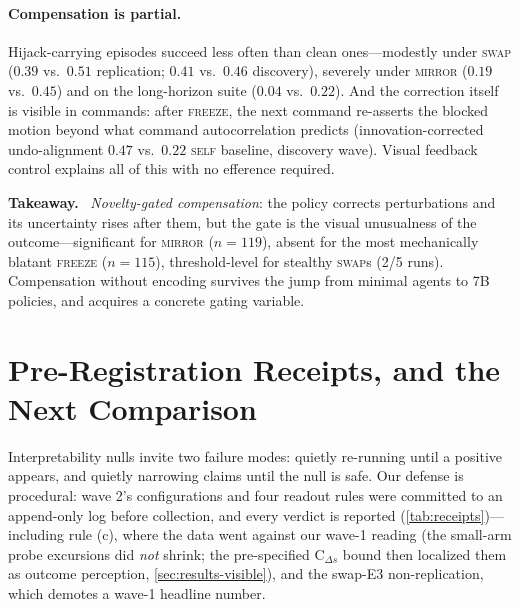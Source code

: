 \documentclass{article}
\newenvironment{takeaway}%
{\begin{lrbox}{\takeawaybox}\begin{minipage}{\dimexpr\columnwidth-14pt}%
\small\textbf{Takeaway.}\ }%
{\end{minipage}\end{lrbox}\par\vspace{4pt}\noindent%
{\setlength{\fboxsep}{6pt}\colorbox{shadecolor}{\usebox{\takeawaybox}}}\par\vspace{4pt}}
\begin{document}
\paragraph{Compensation is partial.} Hijack-carrying episodes succeed less
often than clean ones---modestly under \textsc{swap} ($0.39$ vs.\ $0.51$
replication; $0.41$ vs.\ $0.46$ discovery), severely under \textsc{mirror}
($0.19$ vs.\ $0.45$) and on the long-horizon suite ($0.04$ vs.\ $0.22$).
And the correction itself is visible in commands: after \textsc{freeze},
the next command re-asserts the blocked motion beyond what command
autocorrelation predicts (innovation-corrected undo-alignment $0.47$ vs.\
$0.22$ \textsc{self} baseline, discovery wave). Visual feedback control
explains all of this with no efference required.

\begin{takeaway}
\emph{Novelty-gated compensation}: the policy corrects perturbations and
its uncertainty rises after them, but the gate is the visual unusualness of
the outcome---significant for \textsc{mirror} ($n{=}119$), absent for the
most mechanically blatant \textsc{freeze} ($n{=}115$), threshold-level for
stealthy \textsc{swap}s (2/5 runs). Compensation without encoding
\citep{ye2026prediction} survives the jump from minimal agents to 7B
policies, and acquires a concrete gating variable.
\end{takeaway}

\section{Pre-Registration Receipts, and the Next Comparison}
\label{sec:receipts}

Interpretability nulls invite two failure modes: quietly re-running until a
positive appears, and quietly narrowing claims until the null is safe. Our
defense is procedural: wave 2's configurations and four readout rules were
committed to an append-only log before collection, and every verdict is
reported (\cref{tab:receipts})---including rule (c), where the data went
against our wave-1 reading (the small-arm probe excursions did \emph{not}
shrink; the pre-specified C$_{\Delta s}$ bound then localized them as
outcome perception, \cref{sec:results-visible}), and the swap-E3
non-replication, which demotes a wave-1 headline number.
\end{document}
